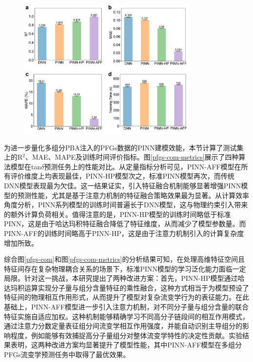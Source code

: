 \begin{figure}[htbp]
  \centering
  \includegraphics[width=0.8\textwidth]{Fig/pfgs-com-metrics.pdf}
\end{figure}
为进一步量化多组分PBA注入的PFGs数据的PINN建模效能，本节计算了测试集上的R$^2$、MAE、MAPE及训练时间评价指标。图\ref{pfgs-com-metrics}展示了四种算法模型在tan$\delta$预测任务上的性能对比。从定量指标分析可见，PINN-AFF模型在所有评价维度上均表现最佳，PINN-HP模型次之，标准PINN模型再次，而传统DNN模型表现最为欠佳。这一结果证实，引入特征融合机制能够显著增强PINN模型的预测性能，尤其是基于注意力机制的特征融合策略效果最为显著。从计算效率角度分析，PINN系列模型的训练时间普遍长于DNN模型，这与物理约束引入带来的额外计算负荷相关。值得注意的是，PINN-HP模型的训练时间略低于标准PINN，这是由于哈达玛积特征融合降低了特征维度，从而减少了模型参数量。而PINN-AFF的训练时间略高于PINN-HP，这是由于注意力机制引入的计算复杂度增加所致。


综合图\ref{pfgs-com}和图\ref{pfgs-com-metrics}的分析结果可知，在处理高维特征空间且特征间存在复杂物理耦合关系的场景下，标准PINN模型的学习泛化能力面临一定局限。针对这一挑战，本研究提出了两种改进方案：首先，PINN-HP模型通过哈达玛积运算实现分子量与组分含量特征的乘性融合，这种方式相当于为模型预设了特征间的物理相互作用形式，从而提升了模型对复杂流变学行为的表征能力。在此基础上，PINN-AFF模型进一步引入注意力机制，对不同分子量与组分含量的联合特征实施自适应加权。这种机制能够精确学习不同高分子链段间的相互作用模式，通过注意力分数定量表征组分间流变学相互作用强度，并能自动识别主导组分的影响程度，例如能够有效捕捉高分子量组分对整体流变学特性的决定性贡献。实验结果表明，这两种改进方案均显著提升了模型性能，其中PINN-AFF模型在多组分PFGs流变学预测任务中取得了最优效果。

